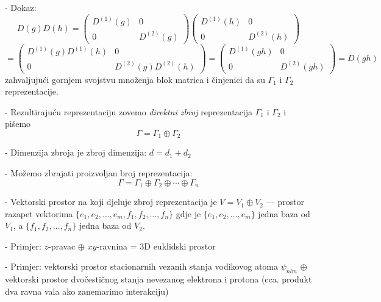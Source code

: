- Dokaz:
\begin{displaymath}
D(g)D(h)=
\left(
   \begin{array}{cc}
     D^{(1)}(g) & 0 \\
       0  & D^{(2)}(g)
\end{array} \right) 
\left(
   \begin{array}{cc}     
     D^{(1)}(h) & 0 \\
       0  & D^{(2)}(h)
\end{array} \right) 
\end{displaymath}
\begin{displaymath}
=\left(
   \begin{array}{cc}     
     D^{(1)}(g)D^{(1)}(h) & 0 \\
       0  & D^{(2)}(g)D^{(2)}(h)
\end{array} \right) 
=\left(
   \begin{array}{cc}     
     D^{(1)}(gh) & 0 \\
       0  & D^{(2)}(gh)
\end{array} \right) 
=D(gh)
\end{displaymath}
zahvaljujući gornjem svojstvu množenja blok matrica i činjenici
da su $\Gamma_1$ i $\Gamma_2$ reprezentacije.

- Rezultirajuću reprezentaciju zovemo \emph{direktni zbroj}
reprezentacija $\Gamma_1$ i $\Gamma_2$ i pišemo
\begin{displaymath}
\Gamma = \Gamma_1 \oplus \Gamma_2
\end{displaymath}

- Dimenzija zbroja je zbroj dimenzija: $d=d_1 + d_2$

- Možemo zbrajati proizvoljan broj reprezentacija:
\begin{displaymath}
\Gamma = \Gamma_1 \oplus \Gamma_2 \oplus \cdots \oplus \Gamma_n
\end{displaymath}

- Vektorski prostor na koji djeluje zbroj reprezentacija je
  $V=V_1 \oplus V_2$ --- prostor razapet vektorima
  $\{e_1, e_2, \ldots, e_m, f_1, f_2, \ldots, f_n\}$ gdje je
  $\{e_1, e_2, \ldots, e_m\}$ jedna baza od $V_1$, a
  $\{f_1, f_2, \ldots, f_n\}$ jedna baza od $V_2$.

- Primjer: $z$-pravac $\oplus$ $xy$-ravnina = 3D euklidski prostor

- Primjer: vektorski prostor stacionarnih vezanih stanja vodikovog
atoma $\psi_{nlm}$ $\oplus$ vektorski prostor dvočestičnog stanja
nevezanog elektrona i protona (cca. produkt dva ravna vala ako
zanemarimo interakciju)

